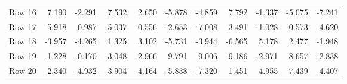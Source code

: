 \begin{sidewaystable}[p]
\begin{tabular}{l*{10}{D{.}{.}{3}}}
Row 16 &   7.190 &  -2.291 &   7.532 &   2.650 &  -5.878 &  -4.859 &   7.792 &  -1.337 &  -5.075 &  -7.241\\
Row 17 &  -5.918 &   0.987 &   5.037 &  -0.556 &  -2.653 &  -7.008 &   3.491 &  -1.028 &   0.573 &   4.620\\
Row 18 &  -3.957 &  -4.265 &   1.325 &   3.102 &  -5.731 &  -3.944 &  -6.565 &   5.178 &   2.477 &  -1.948\\
Row 19 &  -1.228 &  -0.170 &  -3.048 &  -2.966 &   9.791 &   9.006 &   9.186 &  -2.971 &   8.657 &  -2.838\\
Row 20 &  -2.340 &  -4.932 &  -3.904 &   4.164 &  -5.838 &  -7.320 &   1.451 &   4.955 &   7.439 &  -4.407\\
\hline
\end{tabular}
\end{sidewaystable}
